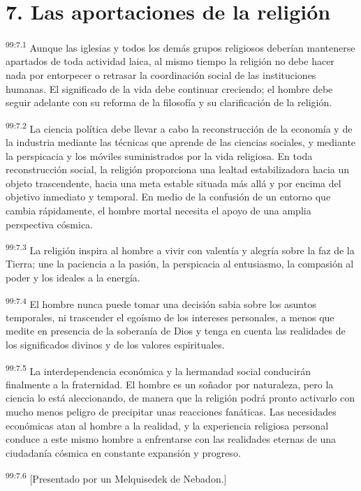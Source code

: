 \section*{7. Las aportaciones de la religión}
\par
\textsuperscript{99:7.1} Aunque las iglesias y todos los demás grupos religiosos deberían mantenerse apartados de toda actividad laica, al mismo tiempo la religión no debe hacer nada por entorpecer o retrasar la coordinación social de las instituciones humanas. El significado de la vida debe continuar creciendo; el hombre debe seguir adelante con su reforma de la filosofía y su clarificación de la religión.

\par
\textsuperscript{99:7.2} La ciencia política debe llevar a cabo la reconstrucción de la economía y de la industria mediante las técnicas que aprende de las ciencias sociales, y mediante la perspicacia y los móviles suministrados por la vida religiosa. En toda reconstrucción social, la religión proporciona una lealtad estabilizadora hacia un objeto trascendente, hacia una meta estable situada más allá y por encima del objetivo inmediato y temporal. En medio de la confusión de un entorno que cambia rápidamente, el hombre mortal necesita el apoyo de una amplia perspectiva cósmica.

\par
\textsuperscript{99:7.3} La religión inspira al hombre a vivir con valentía y alegría sobre la faz de la Tierra; une la paciencia a la pasión, la perspicacia al entusiasmo, la compasión al poder y los ideales a la energía.

\par
\textsuperscript{99:7.4} El hombre nunca puede tomar una decisión sabia sobre los asuntos temporales, ni trascender el egoísmo de los intereses personales, a menos que medite en presencia de la soberanía de Dios y tenga en cuenta las realidades de los significados divinos y de los valores espirituales.

\par
\textsuperscript{99:7.5} La interdependencia económica y la hermandad social conducirán finalmente a la fraternidad. El hombre es un soñador por naturaleza, pero la ciencia lo está aleccionando, de manera que la religión podrá pronto activarlo con mucho menos peligro de precipitar unas reacciones fanáticas. Las necesidades económicas atan al hombre a la realidad, y la experiencia religiosa personal conduce a este mismo hombre a enfrentarse con las realidades eternas de una ciudadanía cósmica en constante expansión y progreso.

\par
\textsuperscript{99:7.6} [Presentado por un Melquisedek de Nebadon.]